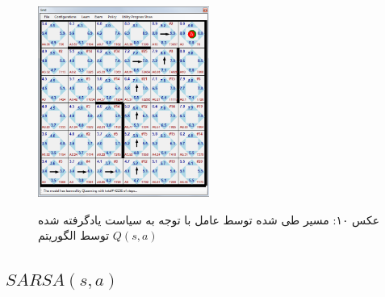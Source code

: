 \documentclass[10pt,a4paper]{article}
\begin{document}
\begin{figure}[H]
    \centering
    \includegraphics[width=0.5\textwidth]{q-exec}
    \begin{center}
    \textarabic{عکس ۱۰: مسیر طی شده توسط عامل با توجه به سیاست یادگرفته شده توسط الگوریتم $Q(s, a)$ }
    \end{center}
\end{figure}

\subsection{$SARSA(s, a)$}
\end{document}
